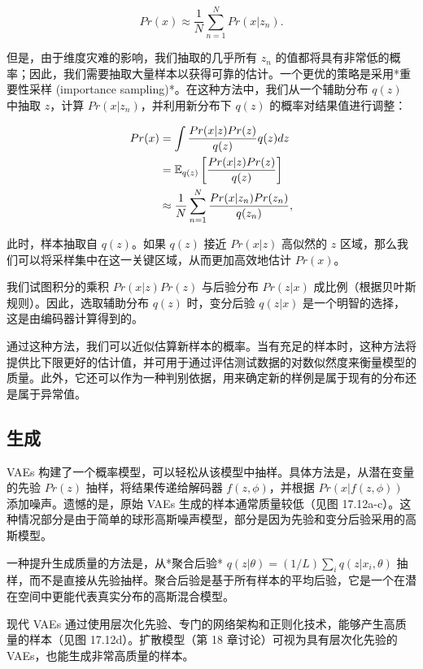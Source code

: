 \documentclass[lang=cn,newtx,10pt,scheme=chinese]{elegantbook}
\begin{document}
\begin{equation}
Pr(x) \approx \frac{1}{N} \sum_{n=1}^{N} Pr(x|z_n). 
\end{equation}

但是，由于维度灾难的影响，我们抽取的几乎所有 \(z_n\) 的值都将具有非常低的概率；因此，我们需要抽取大量样本以获得可靠的估计。一个更优的策略是采用*重要性采样 (importance sampling)*。在这种方法中，我们从一个辅助分布 \(q(z)\) 中抽取 \(z\)，计算 \(Pr(x|z_n)\)，并利用新分布下 \(q(z)\) 的概率对结果值进行调整：


\begin{align}
Pr(x) &= \int \frac{Pr(x|z)Pr(z)}{q(z)}q(z)dz \notag \\
&= \mathbb{E}_{q(z)} \left[\frac{Pr(x|z)Pr(z)}{q(z)}\right] \notag \\
&\approx \frac{1}{N} \sum_{n=1}^{N} \frac{Pr(x|z_n)Pr(z_n)}{q(z_n)}, 
\end{align} 


此时，样本抽取自 \(q(z)\)。如果 \(q(z)\) 接近 \(Pr(x|z)\) 高似然的 \(z\) 区域，那么我们可以将采样集中在这一关键区域，从而更加高效地估计 \(Pr(x)\)。

我们试图积分的乘积 \(Pr(x|z)Pr(z)\) 与后验分布 \(Pr(z|x)\) 成比例（根据贝叶斯规则）。因此，选取辅助分布 \(q(z)\) 时，变分后验 \(q(z|x)\) 是一个明智的选择，这是由编码器计算得到的。

通过这种方法，我们可以近似估算新样本的概率。当有充足的样本时，这种方法将提供比下限更好的估计值，并可用于通过评估测试数据的对数似然度来衡量模型的质量。此外，它还可以作为一种判别依据，用来确定新的样例是属于现有的分布还是属于异常值。

\subsection{生成}
VAEs 构建了一个概率模型，可以轻松从该模型中抽样。具体方法是，从潜在变量的先验 \(Pr(z)\) 抽样，将结果传递给解码器 \(f(z, \phi)\)，并根据 \(Pr(x|f(z, \phi))\) 添加噪声。遗憾的是，原始 VAEs 生成的样本通常质量较低（见图 17.12a-c）。这种情况部分是由于简单的球形高斯噪声模型，部分是因为先验和变分后验采用的高斯模型。

一种提升生成质量的方法是，从*聚合后验* \(q(z|\theta) = (1/L) \sum_{i} q(z|x_i, \theta)\) 抽样，而不是直接从先验抽样。聚合后验是基于所有样本的平均后验，它是一个在潜在空间中更能代表真实分布的高斯混合模型。

现代 VAEs 通过使用层次化先验、专门的网络架构和正则化技术，能够产生高质量的样本（见图 17.12d）。扩散模型（第 18 章讨论）可视为具有层次化先验的 VAEs，也能生成非常高质量的样本。
\end{document}
